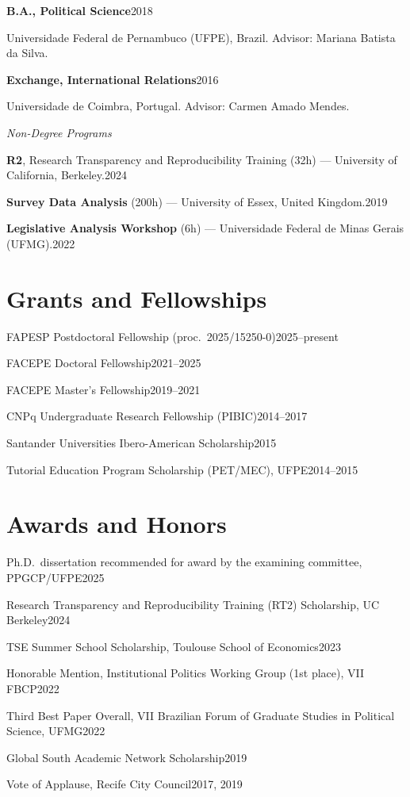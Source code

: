 \documentclass[11pt]{article}
\newcommand{\cvsubsection}[1]{\vspace{0.3em}\textit{#1}\par\vspace{0.1em}}
\newcommand{\entry}[2]{\noindent\textbf{#1}\hfill #2\par}
\newcommand{\entryplain}[2]{\noindent#1\hfill #2\par}
\newcommand{\detail}[1]{\noindent\hspace*{1.5em}#1\par}
\begin{document}
\entry{B.A., Political Science}{2018}
\detail{Universidade Federal de Pernambuco (UFPE), Brazil. Advisor: Mariana Batista da Silva.}

\entry{Exchange, International Relations}{2016}
\detail{Universidade de Coimbra, Portugal. Advisor: Carmen Amado Mendes.}

\cvsubsection{Non-Degree Programs}

\entryplain{\textbf{R2}, Research Transparency and Reproducibility Training (32h) — University of California, Berkeley.}{2024}

\entryplain{\textbf{Survey Data Analysis} (200h) — University of Essex, United Kingdom.}{2019}

\entryplain{\textbf{Legislative Analysis Workshop} (6h) — Universidade Federal de Minas Gerais (UFMG).}{2022}

\section{Grants and Fellowships}

\entryplain{FAPESP Postdoctoral Fellowship (proc.\ 2025/15250-0)}{2025--present}
\entryplain{FACEPE Doctoral Fellowship}{2021--2025}
\entryplain{FACEPE Master's Fellowship}{2019--2021}
\entryplain{CNPq Undergraduate Research Fellowship (PIBIC)}{2014--2017}
\entryplain{Santander Universities Ibero-American Scholarship}{2015}
\entryplain{Tutorial Education Program Scholarship (PET/MEC), UFPE}{2014--2015}

\section{Awards and Honors}

\entryplain{Ph.D.\ dissertation recommended for award by the examining committee, PPGCP/UFPE}{2025}
\entryplain{Research Transparency and Reproducibility Training (RT2) Scholarship, UC Berkeley}{2024}
\entryplain{TSE Summer School Scholarship, Toulouse School of Economics}{2023}
\entryplain{Honorable Mention, Institutional Politics Working Group (1st place), VII FBCP}{2022}
\entryplain{Third Best Paper Overall, VII Brazilian Forum of Graduate Studies in Political Science, UFMG}{2022}
\entryplain{Global South Academic Network Scholarship}{2019}
\entryplain{Vote of Applause, Recife City Council}{2017, 2019}
\end{document}

